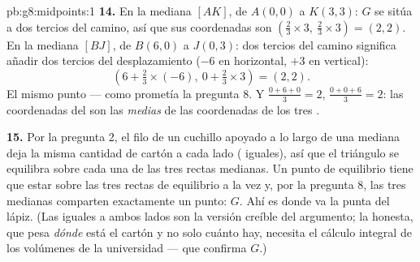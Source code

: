 \begin{solution}{pb:g8:midpoints:1}
\textbf{14.} En la mediana $[AK]$, de $A(0,0)$ a $K(3,3)$: $G$
se sitúa a dos tercios del camino, así que sus coordenadas son
$\left(\frac23 \times 3,\ \frac23 \times 3\right) = (2, 2)$. En
la mediana $[BJ]$, de $B(6, 0)$ a $J(0, 3)$: dos tercios del
camino significa añadir dos tercios del desplazamiento ($-6$
en horizontal, $+3$ en vertical):
\[
\left(6 + \tfrac23 \times (-6),\ 0 + \tfrac23 \times 3\right)
= (2, 2) .
\]
El mismo punto --- como prometía la pregunta 8. Y
$\frac{0 + 6 + 0}{3} = 2$, $\frac{0 + 0 + 6}{3} = 2$: las coordenadas del  son las \emph{medias} de las coordenadas de los tres
.

\textbf{15.} Por la pregunta 2, el filo de un cuchillo apoyado a lo largo de una mediana deja
la misma cantidad de cartón a cada lado ( iguales), así que el
triángulo se equilibra sobre cada una de las tres rectas medianas. Un punto
de equilibrio tiene que estar sobre las tres rectas de equilibrio a la vez y, por
la pregunta 8, las tres medianas comparten exactamente un punto: $G$. Ahí
es donde va la punta del lápiz. (Las  iguales a ambos lados son la
versión creíble del argumento; la honesta, que pesa
\emph{dónde} está el cartón y no solo cuánto hay,
necesita el cálculo integral de los volúmenes de la universidad --- que
confirma $G$.)
\end{solution}
